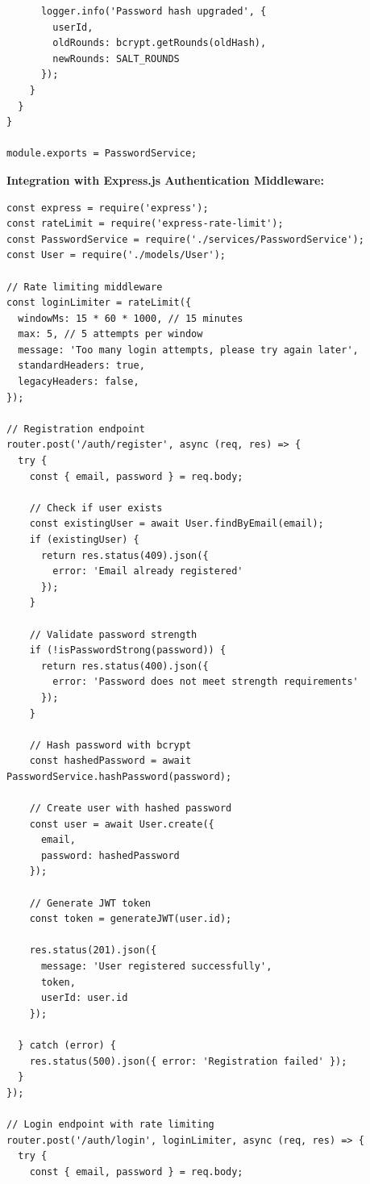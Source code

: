 \documentclass[12pt,a4paper]{article}
\begin{document}
\begin{tcolorbox}[colback=primaryblue!5, colframe=primaryblue, boxrule=1pt, arc=3pt, left=10pt, right=10pt, top=8pt, bottom=8pt]
\begin{verbatim}
      logger.info('Password hash upgraded', {
        userId,
        oldRounds: bcrypt.getRounds(oldHash),
        newRounds: SALT_ROUNDS
      });
    }
  }
}

module.exports = PasswordService;
\end{verbatim}

\vspace{0.5em}

\textbf{Integration with Express.js Authentication Middleware:}

\begin{verbatim}
const express = require('express');
const rateLimit = require('express-rate-limit');
const PasswordService = require('./services/PasswordService');
const User = require('./models/User');

// Rate limiting middleware
const loginLimiter = rateLimit({
  windowMs: 15 * 60 * 1000, // 15 minutes
  max: 5, // 5 attempts per window
  message: 'Too many login attempts, please try again later',
  standardHeaders: true,
  legacyHeaders: false,
});

// Registration endpoint
router.post('/auth/register', async (req, res) => {
  try {
    const { email, password } = req.body;
    
    // Check if user exists
    const existingUser = await User.findByEmail(email);
    if (existingUser) {
      return res.status(409).json({ 
        error: 'Email already registered' 
      });
    }
    
    // Validate password strength
    if (!isPasswordStrong(password)) {
      return res.status(400).json({
        error: 'Password does not meet strength requirements'
      });
    }
    
    // Hash password with bcrypt
    const hashedPassword = await PasswordService.hashPassword(password);
    
    // Create user with hashed password
    const user = await User.create({
      email,
      password: hashedPassword
    });
    
    // Generate JWT token
    const token = generateJWT(user.id);
    
    res.status(201).json({
      message: 'User registered successfully',
      token,
      userId: user.id
    });
    
  } catch (error) {
    res.status(500).json({ error: 'Registration failed' });
  }
});

// Login endpoint with rate limiting
router.post('/auth/login', loginLimiter, async (req, res) => {
  try {
    const { email, password } = req.body;
    

\end{verbatim}
\end{tcolorbox}
\end{document}
